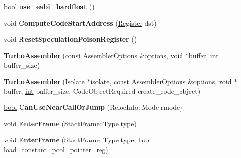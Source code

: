 \begin{DoxyCompactItemize}
\mbox{\hyperlink{classbool}{bool}} {\bfseries use\+\_\+eabi\+\_\+hardfloat} ()
\item 
\mbox{\label{classv8_1_1internal_1_1TurboAssembler_afa16b0e3be91d3616e9f613b954621dd}} 
void {\bfseries Compute\+Code\+Start\+Address} (\mbox{\hyperlink{classv8_1_1internal_1_1Register}{Register}} dst)
\item 
\mbox{\label{classv8_1_1internal_1_1TurboAssembler_a282571b73c77ef466d68a106c557956d}} 
void {\bfseries Reset\+Speculation\+Poison\+Register} ()
\item 
\mbox{\label{classv8_1_1internal_1_1TurboAssembler_ac5a1cdee47961f289dbb095cc534ef95}} 
{\bfseries Turbo\+Assembler} (const \mbox{\hyperlink{structv8_1_1internal_1_1AssemblerOptions}{Assembler\+Options}} \&options, void $\ast$buffer, \mbox{\hyperlink{classint}{int}} buffer\+\_\+size)
\item 
\mbox{\label{classv8_1_1internal_1_1TurboAssembler_ac5d3c303e7abed78a6c1fe7f9834c045}} 
{\bfseries Turbo\+Assembler} (\mbox{\hyperlink{classv8_1_1internal_1_1Isolate}{Isolate}} $\ast$isolate, const \mbox{\hyperlink{structv8_1_1internal_1_1AssemblerOptions}{Assembler\+Options}} \&options, void $\ast$buffer, \mbox{\hyperlink{classint}{int}} buffer\+\_\+size, Code\+Object\+Required create\+\_\+code\+\_\+object)
\item 
\mbox{\label{classv8_1_1internal_1_1TurboAssembler_a827b172382ccf71713b6ff6725dd0b05}} 
\mbox{\hyperlink{classbool}{bool}} {\bfseries Can\+Use\+Near\+Call\+Or\+Jump} (Reloc\+Info\+::\+Mode rmode)
\item 
\mbox{\label{classv8_1_1internal_1_1TurboAssembler_a4aea206c1c673c33c7ef241e8bca04ea}} 
void {\bfseries Enter\+Frame} (Stack\+Frame\+::\+Type \mbox{\hyperlink{classstd_1_1conditional_1_1type}{type}})
\item 
\mbox{\label{classv8_1_1internal_1_1TurboAssembler_af705c58e218094857590d07367afb65f}} 
void {\bfseries Enter\+Frame} (Stack\+Frame\+::\+Type \mbox{\hyperlink{classstd_1_1conditional_1_1type}{type}}, \mbox{\hyperlink{classbool}{bool}} load\+\_\+constant\+\_\+pool\+\_\+pointer\+\_\+reg)

\end{DoxyCompactItemize}
